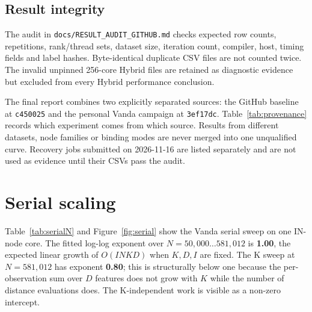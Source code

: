 \documentclass[10pt,a4paper]{article}
\newcommand{\code}[1]{\texttt{#1}}
\begin{document}
\subsection{Result integrity}
The audit in \code{docs/RESULT\_AUDIT\_GITHUB.md} checks expected row counts,
repetitions, rank/thread sets, dataset size, iteration count, compiler, host,
timing fields and label hashes. Byte-identical duplicate CSV files are not
counted twice. The invalid unpinned 256-core Hybrid files are retained as
diagnostic evidence but excluded from every Hybrid performance conclusion.

The final report combines two explicitly separated sources: the GitHub
baseline at \code{c450025} and the personal Vanda campaign at
\code{3ef17dc}. Table~\ref{tab:provenance} records which experiment comes from
which source. Results from different datasets, node families or binding modes
are never merged into one unqualified curve. Recovery jobs submitted on
2026-11-16 are listed separately and are not used as evidence until their CSVs
pass the audit.

\begin{table}[H]
\centering\scriptsize
\caption{Provenance of the results used in this report.}
\label{tab:provenance}
\resizebox{\textwidth}{!}{}
\end{table}

\section{Serial scaling}
Table~\ref{tab:serialN} and Figure~\ref{fig:serial} show the Vanda serial
sweep on one IN-node core. The fitted log-log exponent over
$N=50{,}000\ldots581{,}012$ is \textbf{1.00}, the expected linear growth of
$O(I N K D)$ when $K,D,I$ are fixed. The K sweep at $N=581{,}012$ has exponent
\textbf{0.80}; this is structurally below one because the per-observation sum
over $D$ features does not grow with $K$ while the number of distance
evaluations does. The K-independent work is visible as a non-zero intercept.

\begin{table}[H]
\centering\small
\caption{Serial fit time on Vanda (one core, K=7, D=54, I=30, median of 3).}
\label{tab:serialN}

\end{table}

\begin{table}[H]
\centering\small
\caption{Serial K sweep at N=581,012 (one core, D=54, I=30, median of 3).}
\label{tab:serialK}

\end{table}
\end{document}
